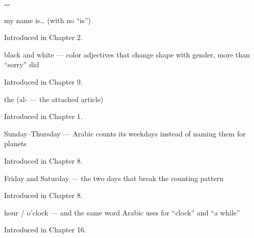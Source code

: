 \noindent\begin{minipage}[t]{\linewidth}
\raggedright
\textbf{ …}\par
\small my name is… (with no \textquotedblleft{}is\textquotedblright{})\par
\footnotesize Introduced in Chapter 2.
\end{minipage}\par\medskip

\noindent\begin{minipage}[t]{\linewidth}
\raggedright
\textbf{ }\par
\small black and white — color adjectives that change shape with gender, more than \textquotedblleft{}sorry\textquotedblright{} did\par
\footnotesize Introduced in Chapter 9.
\end{minipage}\par\medskip

\noindent\begin{minipage}[t]{\linewidth}
\raggedright
\textbf{}\par
\small the (al- — the attached article)\par
\footnotesize Introduced in Chapter 1.
\end{minipage}\par\medskip

\noindent\begin{minipage}[t]{\linewidth}
\raggedright
\textbf{    }\par
\small Sunday–Thursday — Arabic counts its weekdays instead of naming them for planets\par
\footnotesize Introduced in Chapter 8.
\end{minipage}\par\medskip

\noindent\begin{minipage}[t]{\linewidth}
\raggedright
\textbf{ }\par
\small Friday and Saturday — the two days that break the counting pattern\par
\footnotesize Introduced in Chapter 8.
\end{minipage}\par\medskip

\noindent\begin{minipage}[t]{\linewidth}
\raggedright
\textbf{}\par
\small hour / o'clock — and the same word Arabic uses for \textquotedblleft{}clock\textquotedblright{} and \textquotedblleft{}a while\textquotedblright{}\par
\footnotesize Introduced in Chapter 16.
\end{minipage}\par\medskip

